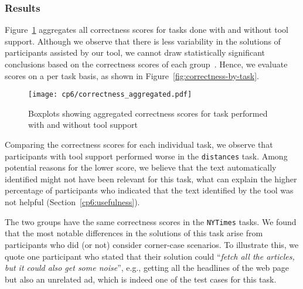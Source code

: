 

\subsubsection{Results}


Figure~\ref{fig:correctness-overall} aggregates all correctness scores for tasks done with and without tool support.
Although we observe that there is less variability in the solutions of participants assisted by our tool,
we cannot draw statistically significant conclusions based on the correctness scores of each group~\cite{Lazar2017-cp3}.
Hence, we evaluate scores on a per task basis, as shown in Figure~\ref{fig:correctness-by-task}.



\medskip
\begin{figure}
    \centering
    \texttt{[image: cp6/correctness\_aggregated.pdf]}
    \caption{Boxplots showing aggregated correctness scores for task performed with and without tool support}
    \label{fig:correctness-overall}
\end{figure}




Comparing the correctness scores for each individual task, we observe that participants with tool support performed worse in the \texttt{distances} task. 
Among potential reasons for the lower score, we believe that the text automatically identified 
might not have been relevant for this task, what can explain the higher percentage of participants
who indicated that the text identified  by the tool was not helpful (Section~\ref{cp6:usefulness}).



The two groups have the same correctness scores in the \texttt{NYTimes} tasks.
We found that the most notable differences in the solutions of this task arise from participants who did (or not) consider corner-case scenarios.
To illustrate this, we quote one participant who stated that their solution could ``\textit{fetch all the articles, but it could also get some noise}'',
e.g., getting all the headlines of the web page but also an unrelated ad, which is indeed one of the test cases for this task. 



